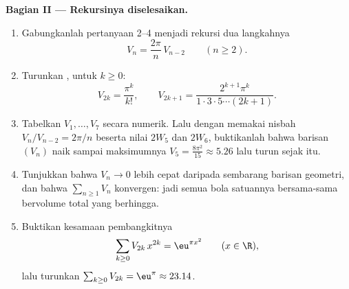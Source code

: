 \begin{problem}[{Soal akhir pekan --- $V_n =
\pi^{n/2}/\Gamma(\frac n2 + 1)$, dan keanehan dimensi
tinggi}]
\medskip
\noindent\textbf{Bagian II --- Rekursinya diselesaikan.}
\begin{enumerate}[resume]
  \item Gabungkanlah pertanyaan 2--4 menjadi rekursi dua langkahnya
        \[
        V_n = \frac{2\pi}{n}\,V_{n-2}
        \qquad (n \geq 2).
        \]
  \item Turunkan , untuk $k \geq 0$:
        \[
        V_{2k} = \frac{\pi^k}{k!},
        \qquad
        V_{2k+1} = \frac{2^{k+1}\pi^k}{1\cdot3\cdot5\cdots
        (2k+1)} .
        \]
  \item Tabelkan $V_1, \dots, V_7$ secara numerik. Lalu dengan memakai
        nisbah $V_n/V_{n-2} = 2\pi/n$ beserta nilai $2W_5$
        dan $2W_6$, buktikanlah bahwa barisan $(V_n)$ naik
        sampai maksimumnya $V_5 = \frac{8\pi^2}{15} \approx
        5.26$ lalu turun sejak itu.
  \item Tunjukkan bahwa $V_n \to 0$ lebih cepat daripada sembarang barisan
        geometri, dan bahwa $\sum_{n\geq1} V_n$ konvergen: jadi semua
        bola satuannya bersama-sama bervolume total yang berhingga.
  \item Buktikan kesamaan pembangkitnya
        \[
        \sum_{k\geq0} V_{2k}\,x^{2k} = \eu^{\pi x^2}
        \qquad (x \in \R),
        \]
        lalu turunkan $\sum_{k\geq0}V_{2k} = \eu^\pi \approx
        23.14$.
\end{enumerate}


\end{problem}
